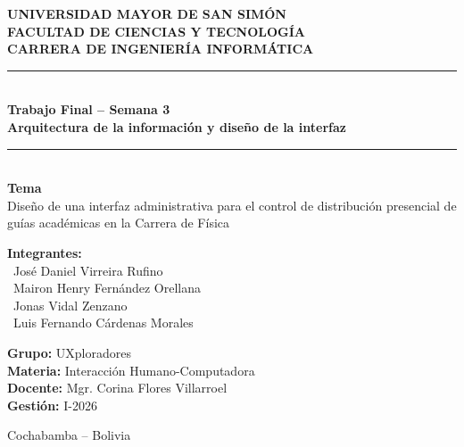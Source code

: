 ﻿\documentclass[12pt,letterpaper]{article}
\begin{document}
\begin{titlepage}
    \centering

    {\large \textbf{UNIVERSIDAD MAYOR DE SAN SIMÓN}}\\
    {\large \textbf{FACULTAD DE CIENCIAS Y TECNOLOGÍA}}\\
    {\large \textbf{CARRERA DE INGENIERÍA INFORMÁTICA}}\\[0.5cm]

    \rule{\textwidth}{0.5pt}\\[0.5cm]
    {\Large \textbf{Trabajo Final -- Semana 3}}\\[0.3cm]
    {\large \textbf{Arquitectura de la información y diseño de la interfaz}}\\[0.5cm]
    \rule{\textwidth}{0.5pt}\\[1cm]

    {\large \textbf{Tema}}\\[0.3cm]
    {\large Diseño de una interfaz administrativa para el control de distribución presencial de guías académicas en la Carrera de Física}\\[2cm]

    \begin{flushleft}
        \textbf{Integrantes:}\\
        \hspace*{0.5cm}\textbullet\ José Daniel Virreira Rufino\\
        \hspace*{0.5cm}\textbullet\ Mairon Henry Fernández Orellana\\
        \hspace*{0.5cm}\textbullet\ Jonas Vidal Zenzano\\
        \hspace*{0.5cm}\textbullet\ Luis Fernando Cárdenas Morales
    \end{flushleft}

    \begin{flushleft}
        \textbf{Grupo:} UXploradores\\
        \textbf{Materia:} Interacción Humano-Computadora\\
        \textbf{Docente:} Mgr. Corina Flores Villarroel\\
        \textbf{Gestión:} I-2026
    \end{flushleft}

    \vfill

    {\small Cochabamba -- Bolivia}\\
\end{titlepage}
\end{document}
